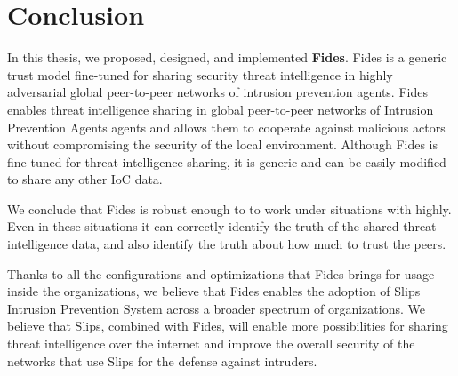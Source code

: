 \chapter{Conclusion}
\label{ch:conclusion}

In this thesis, we proposed, designed, and implemented \textbf{Fides}. Fides is a generic trust model fine-tuned for sharing security threat intelligence in highly adversarial global peer-to-peer networks of intrusion prevention agents.
Fides enables threat intelligence sharing in global peer-to-peer networks of Intrusion Prevention Agents agents and allows them to cooperate against malicious actors without compromising the security of the local environment. 
Although Fides is fine-tuned for threat intelligence sharing, it is generic and can be easily modified to share any other IoC data.

We conclude that Fides is robust enough to to work under situations with highly. Even in these situations it can correctly identify the truth of the shared threat intelligence data, and also identify the truth about how much to trust the peers.

Thanks to all the configurations and optimizations that Fides brings for usage inside the organizations, we believe that Fides enables the adoption of Slips Intrusion Prevention System across a broader spectrum of organizations.
We believe that Slips, combined with Fides, will enable more possibilities for sharing threat intelligence over the internet and improve the overall security of the networks that use Slips for the defense against intruders.


